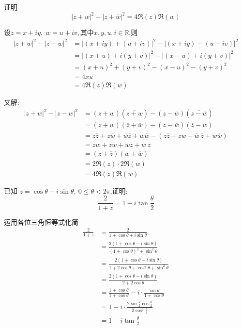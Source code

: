 \begin{questions}
    \question 证明
        \[
        |z+w|^2-|z+\overline{w}|^2=4\Re(z)\Re(w)
        \]
    \begin{solution}
        设$z = x + iy,\;w = u + iv,$其中$x,y,u,i\in \mathbb{R}$,则
        \begin{align*}
        |z+w|^2 - |z-\overline{w}|^2 
        &= |(x+iy) + (u+iv)|^2 - |(x+iy) - (u-iv)|^2 \\
        &= |(x+u) + i(y+v)|^2 - |(x-u) + i(y+v)|^2 \\
        &= (x+u)^2 + (y+v)^2 - (x-u)^2 - (y+v)^2 \\
        &= 4xu \\
        &= 4 \Re(z) \Re(w)
        \end{align*}
    \end{solution}
    \begin{solution}
        又解:
        \begin{align*} 
        |z + w|^2 - |z - w|^2 
        &= (z + w)(\overline{z+w}) - (z - \overline{w})(\overline{z - \overline{w}}) \\
        &= (z + w)(\overline{z}+\overline{w}) - (z - \overline{w})(\overline{z} - w)\\
        &= z\overline{z} + z\overline{w} + w\overline{z} + w\overline{w} - \left( z\overline{z} - zw - \overline{w}\:\overline{z} + w\overline{w} \right) \\
        &= zw+z\overline{w}+w\overline{z}+\overline{w}\:\overline{z}\\
        &=(z+\overline{z})(w+\overline{w})\\
        &=2\Re(z)\cdot 2\Re(w)\\
        &=4 \Re(z) \Re(w)
        \end{align*}
    \end{solution}    
    
    \question 已知 \(z=\cos\theta+i\sin\theta,\ 0\leq\theta<2\pi\),证明:
    \[
    \frac{2}{1+z}=1-i\tan\frac{\theta}{2}
    \]
    \begin{solution}
        运用各位三角恒等式化简
        \begin{align*}
        \frac{2}{1+z} 
        &= \frac{2}{1+\cos\theta+i\sin\theta} \\
        &= \frac{2(1+\cos\theta - i\sin\theta)}{(1+\cos\theta)^2 + \sin^2\theta} \\
        &= \frac{2(1+\cos\theta - i\sin\theta)}{1 + 2\cos\theta + \cos^2\theta + \sin^2\theta} \\
        &= \frac{2(1+\cos\theta - i\sin\theta)}{2 + 2\cos\theta} \\
        &= \frac{1+\cos\theta}{1+\cos\theta} - i\cdot\frac{\sin\theta}{1+\cos\theta} \\
        &= 1 - i \cdot \frac{2\sin\frac{\theta}{2}\cos\frac{\theta}{2}}{2\cos^2\frac{\theta}{2}} \\
        &= 1 - i \tan\frac{\theta}{2}
        \end{align*}
    \end{solution}  
    

\end{questions}
